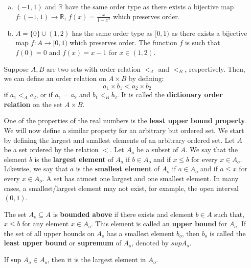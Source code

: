 \documentclass[a4paper,english,12pt]{article}
\newcommand{\Real}{\mathbb{R}}
\begin{document}
\begin{exmp}
\begin{enumerate}[a)]
\item $(-1, 1)$ and $\Real$ have the same order type as there exists a bijective map $f:(-1, 1) \to \Real$, $f(x) = \frac{x}{1 - x^{2}}$ which preserves order.
\item $A = \{0\} \cup (1, 2)$ has the same order type as $[0, 1)$ as there exists a bijective map $f: A \to [0, 1)$ which preserves order. The function $f$ is such that $f(0) = 0$ and $f(x) = x-1$ for $x \in (1, 2)$.

\end{enumerate}
\end{exmp}


\begin{defn} 
Suppose $A, B$ are two sets with order relation $<_{A}$ and $<_{B}$, respectively. Then, we can define an order relation on $A \times B$ by defining: 
\begin{equation}
a_{1} \times b_{1} < a_{2} \times b_{2} \nonumber
\end{equation}
if $a_{1} <_{A} a_{2}$, or if $a_{1} = a_{2}$ and $b_{1} <_{B} b_{2}$. It is called the \textbf{dictionary order relation} on the set $A \times B$. 
\end{defn}

One of the properties of the real numbers is the \textbf{least upper bound property}. We will now define a similar property for an arbitrary but ordered set. We start by defining the largest and smallest elements of an arbitrary ordered set. Let $A$ be a set ordered by the relation $<$. Let $A_{o}$ be a subset of $A$.  We say that the element $b$ is the \textbf{largest element} of $A_{o}$ if $b \in A_{o}$ and if $x \le b$ for every $x \in A_{o}$. Likewise, we say that $a$ is the \textbf{smallest element} of $A_{o}$ if $a \in A_{o}$ and if $a \le x$ for every $x \in A_{o}$. A set has atmost one largest and one smallest element. In many cases, a smallest/largest element may not exist, for example, the open interval $(0,1)$. 

\begin{defn}
The set $A_{o} \subseteq A$ is \textbf{bounded above} if there exists and element $b \in A$ such that, $x \le b$ for any element $x \in A_{o}$. This element is called an \textbf{upper bound} for $A_{o}$. If the set of all upper bounds on $A_{o}$ has a smallest element $b_{o}$, then $b_{o}$ is called the \textbf{least upper bound} or \textbf{supremum} of $A_{o}$, denoted by $sup A_{o}$.  

If $\text{sup } A_{o} \in A_{o}$, then it is the largest element in $A_{o}$.
\end{defn}
\end{document}
